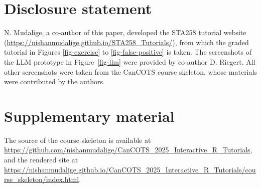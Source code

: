 \documentclass[
  12pt]{article}
\begin{document}
\section*{Disclosure statement}\label{disclosure-statement}

N. Mudalige, a co-author of this paper, developed the STA258 tutorial
website (\url{https://nishanmudalige.github.io/STA258_Tutorials/}), from
which the graded tutorial in Figures \ref{fig-exercise} to
\ref{fig-false-positive} is taken. The screenshots of the LLM prototype
in Figure~\ref{fig-llm} were provided by co-author D. Riegert. All other
screenshots were taken from the CanCOTS course skeleton, whose materials
were contributed by the authors.

\section*{Supplementary material}\label{supplementary-material}

The source of the course skeleton is available at
\url{https://github.com/nishanmudalige/CanCOTS_2025_Interactive_R_Tutorials},
and the rendered site at
\url{https://nishanmudalige.github.io/CanCOTS_2025_Interactive_R_Tutorials/course_skeleton/index.html}.



\end{document}
